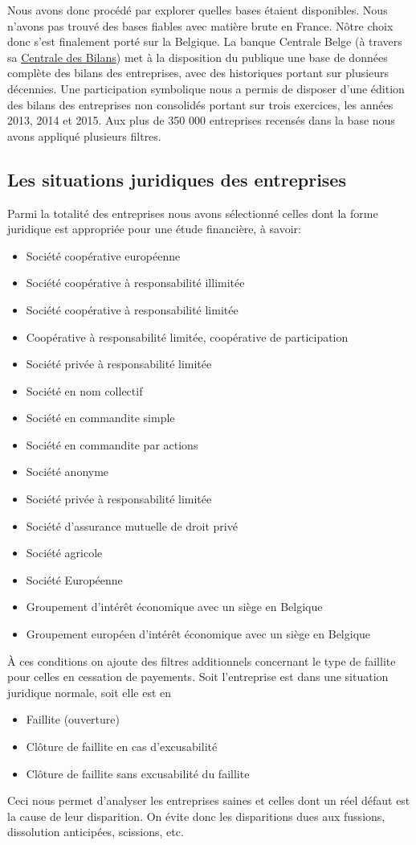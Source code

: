 \documentclass[DIV=calc, paper=a4, fontsize=11pt, twocolumn]{scrartcl}
\begin{document}
Nous avons donc procédé par explorer quelles bases étaient disponibles. Nous n'avons pas trouvé des bases fiables avec matière brute en France. Nôtre choix donc s'est finalement porté sur la Belgique. La banque Centrale Belge (à travers sa \href{https://www.nbb.be/fr/centrale-des-bilans}{Centrale des Bilans}) met à la disposition du publique une base de données complète des bilans des entreprises, avec des historiques portant sur plusieurs décennies. Une participation symbolique nous a permis de disposer d'une édition des bilans des entreprises non consolidés portant sur trois exercices, les années 2013, 2014 et 2015. Aux plus de 350 000 entreprises recensés dans la base nous avons appliqué plusieurs filtres.

\subsection{Les situations juridiques des entreprises}
Parmi la totalité des entreprises nous avons sélectionné celles dont la forme juridique est appropriée pour une étude financière, à savoir:
\begin{itemize}
    \item Société coopérative européenne
    \item Société coopérative à responsabilité illimitée
    \item Société coopérative à responsabilité limitée
    \item Coopérative à responsabilité limitée, coopérative de participation
    \item Société privée à responsabilité limitée
    \item Société en nom collectif
    \item Société en commandite simple
    \item Société en commandite par actions
    \item Société anonyme
    \item Société privée à responsabilité limitée
    \item Société d'assurance mutuelle de droit privé
    \item Société agricole
    \item Société Européenne
    \item Groupement d'intérêt économique avec un siège en Belgique
    \item Groupement européen d'intérêt économique avec un siège en Belgique
\end{itemize}
À ces conditions on ajoute des filtres additionnels concernant le type de faillite pour celles en cessation de payements. Soit l'entreprise est dans une situation juridique normale, soit elle est en
\begin{itemize}
    \item Faillite (ouverture)
    \item Clôture de faillite en cas d'excusabilité
    \item Clôture de faillite sans excusabilité du faillite
\end{itemize}
Ceci nous permet d'analyser les entreprises saines et celles dont un réel défaut est la cause de leur disparition. On évite donc les disparitions dues aux fussions, dissolution anticipées, scissions, etc.  
\end{document}
